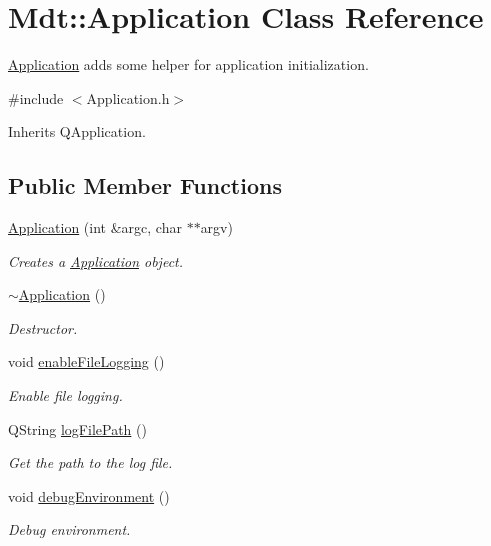 \hypertarget{class_mdt_1_1_application}{}\section{Mdt\+:\+:Application Class Reference}
\label{class_mdt_1_1_application}


\hyperlink{class_mdt_1_1_application}{Application} adds some helper for application initialization.  




{\ttfamily \#include $<$Application.\+h$>$}



Inherits Q\+Application.

\subsection*{Public Member Functions}
\begin{DoxyCompactItemize}
\item 
\hyperlink{class_mdt_1_1_application_a5038a26f5618eba0c6f8c51e7eca76dd}{Application} (int \&argc, char $\ast$$\ast$argv)
\begin{DoxyCompactList}\small\item\em Creates a \hyperlink{class_mdt_1_1_application}{Application} object. \end{DoxyCompactList}\item 
\hyperlink{class_mdt_1_1_application_a24456c7eb1e79fa5c73459f1c64f7e84}{$\sim$\+Application} ()
\begin{DoxyCompactList}\small\item\em Destructor. \end{DoxyCompactList}\item 
void \hyperlink{class_mdt_1_1_application_ab16dbd8818c2bf6e0c82208b3f5c829b}{enable\+File\+Logging} ()
\begin{DoxyCompactList}\small\item\em Enable file logging. \end{DoxyCompactList}\item 
Q\+String \hyperlink{class_mdt_1_1_application_a8531dd25ea6a6dba62f1bcaea89723a7}{log\+File\+Path} ()
\begin{DoxyCompactList}\small\item\em Get the path to the log file. \end{DoxyCompactList}\item 
void \hyperlink{class_mdt_1_1_application_a055baa70e5c4f78c2472ca39755aa111}{debug\+Environment} ()
\begin{DoxyCompactList}\small\item\em Debug environment. \end{DoxyCompactList}\end{DoxyCompactItemize}
